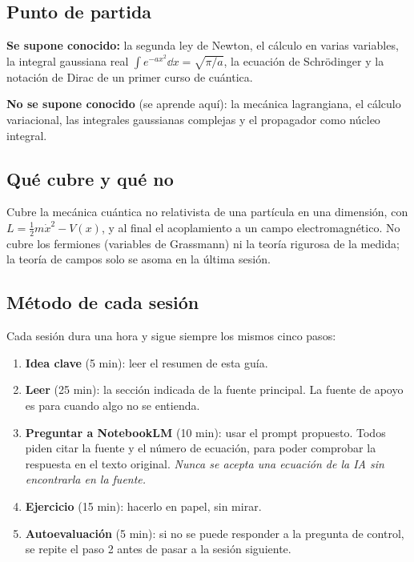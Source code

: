 \subsection{Punto de partida}

\textbf{Se supone conocido:} la segunda ley de Newton, el cálculo en varias variables, la integral gaussiana real $\int e^{-ax^2}\dd x=\sqrt{\pi/a}$, la ecuación de Schrödinger y la notación de Dirac de un primer curso de cuántica.

\textbf{No se supone conocido} (se aprende aquí): la mecánica lagrangiana, el cálculo variacional, las integrales gaussianas complejas y el propagador como núcleo integral.

\subsection{Qué cubre y qué no}

Cubre la mecánica cuántica no relativista de una partícula en una dimensión, con $L=\tfrac12m\dot x^2-V(x)$, y al final el acoplamiento a un campo electromagnético. No cubre los fermiones (variables de Grassmann) ni la teoría rigurosa de la medida; la teoría de campos solo se asoma en la última sesión.

\subsection{Método de cada sesión}

Cada sesión dura una hora y sigue siempre los mismos cinco pasos:
\begin{enumerate}
    \item \textbf{Idea clave} (5 min): leer el resumen de esta guía.
    \item \textbf{Leer} (25 min): la sección indicada de la fuente principal. La fuente de apoyo es para cuando algo no se entienda.
    \item \textbf{Preguntar a NotebookLM} (10 min): usar el prompt propuesto. Todos piden citar la fuente y el número de ecuación, para poder comprobar la respuesta en el texto original. \emph{Nunca se acepta una ecuación de la IA sin encontrarla en la fuente.}
    \item \textbf{Ejercicio} (15 min): hacerlo en papel, sin mirar.
    \item \textbf{Autoevaluación} (5 min): si no se puede responder a la pregunta de control, se repite el paso 2 antes de pasar a la sesión siguiente.
\end{enumerate}

